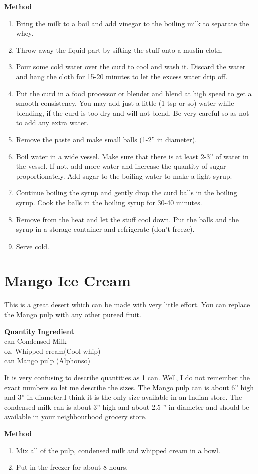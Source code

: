 {\bf Method}
\begin{enumerate}
\item Bring the milk to a boil and add vinegar to the boiling milk to separate
the whey. 
\item Throw away the liquid part by sifting the stuff onto a muslin cloth.
\item Pour some cold water over the curd to cool and wash it. 
Discard the water and hang the cloth for 15-20 minutes to let the excess
water drip off. 
\item Put the curd in a food processor or blender and blend at high speed to
get a smooth consistency. You may add just a little (1 tsp or so)
water while blending, if the curd is too dry and will not blend. Be very
careful so as not to add any extra water.
\item Remove the paste and make small balls (1-2'' in diameter). 
\item Boil water in a wide vessel. Make sure that there is at least
2-3'' of water in the vessel. If not, add more water and increase
the quantity of sugar proportionately. Add sugar to the boiling water to
make a light syrup.  
\item Continue boiling the syrup and gently drop the curd balls in the
boiling syrup. Cook the balls in the boiling syrup for 30-40 minutes. 
\item Remove from the heat and let the stuff cool down. Put the balls
and the syrup in a storage container and refrigerate (don't freeze). 
\item Serve cold.
\end{enumerate}


\section{Mango Ice Cream}
This is a great desert which can be made with very little effort. You
can replace the Mango pulp with any other pureed fruit.
\begin{tabbing}
\hspace{1.0cm}  \={\bf Quantity}   \hspace{3.0cm} \={\bf Ingredient}\\
 can	\> Condensed Milk\\
 oz.	\> Whipped cream(Cool whip)\\
 can  	\> Mango pulp (Alphonso)\\
\end{tabbing}
It is very confusing to describe quantities as  1 can.
Well, I do not remember the exact numbers so let me
describe the sizes. The Mango pulp can is about 6'' high and 3'' in
diameter.I think it is the only size available in an Indian store. The
condensed milk can is about 3'' high and about 2.5 '' in diameter and
should be available in your neighbourhood grocery store.

{\bf Method}
\begin{enumerate}
\item Mix all of the pulp, condensed milk and whipped cream in a bowl.
\item Put in the freezer for about 8 hours.
\end{enumerate}




